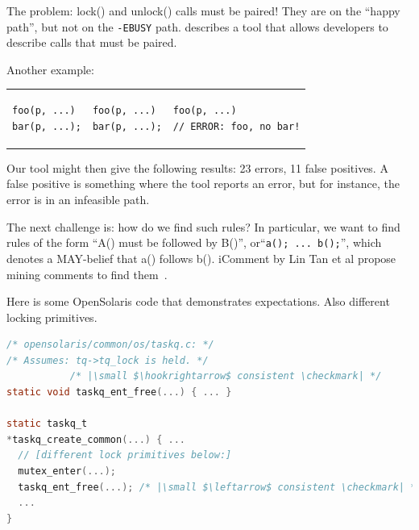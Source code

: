 \documentclass[11pt]{article}
\begin{document}
The problem: lock() and unlock() calls must be paired! They are on the ``happy path'', but not on the {\tt -EBUSY} path.
\cite{EnglerETAL00CheckingSystemRulesUsingSystemspecificProgrammerwritten} describes a tool that allows developers
to describe calls that must be paired.

Another example:

\begin{tabular}{l|l|l}
        \begin{minipage}{.24\textwidth}
          \begin{lstlisting}
foo(p, ...)
bar(p, ...);
          \end{lstlisting}
        \end{minipage} &
        \begin{minipage}{.24\textwidth}
          \begin{lstlisting}
foo(p, ...)
bar(p, ...);
          \end{lstlisting}
        \end{minipage} &
        \begin{minipage}{.5\textwidth}
          \begin{lstlisting}
foo(p, ...)
// ERROR: foo, no bar!
          \end{lstlisting}
        \end{minipage}
        
\end{tabular}
Our tool might then give the following results: 23 errors, 11 false positives. A false positive is something where
the tool reports an error, but for instance, the error is in an infeasible path.

The next challenge is: how do we find such rules? In particular, we want to find rules of the form ``A() must be followed by B()'',
or``{\tt a(); ... b();}'', which denotes a MAY-belief that a() follows b(). iComment by Lin Tan et al propose mining
comments to find them~\cite{TanETAL07IcommentBugsBadComments}.

Here is some OpenSolaris code that demonstrates expectations. Also different locking primitives.

\begin{lstlisting}[language=C,escapechar=|]
/* opensolaris/common/os/taskq.c: */
/* Assumes: tq->tq_lock is held. */
           /* |\small $\hookrightarrow$ consistent \checkmark| */
static void taskq_ent_free(...) { ... }

static taskq_t
*taskq_create_common(...) { ...
  // [different lock primitives below:]
  mutex_enter(...);
  taskq_ent_free(...); /* |\small $\leftarrow$ consistent \checkmark| */
  ...
}
\end{lstlisting}
\end{document}
